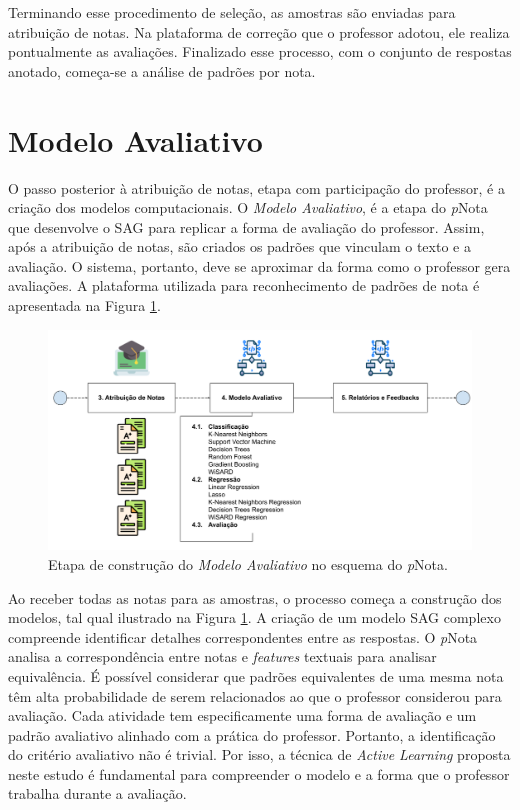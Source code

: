 Terminando esse procedimento de seleção, as amostras são enviadas para atribuição de notas. Na plataforma de correção que o professor adotou, ele realiza pontualmente as avaliações. Finalizado esse processo, com o conjunto de respostas anotado, começa-se a análise de padrões por nota.


\section{Modelo Avaliativo}
\label{sec-avaliacao}

O passo posterior à atribuição de notas, etapa com participação do professor, é a criação dos modelos computacionais. O \textit{Modelo Avaliativo}, é a etapa do \textit{p}Nota que desenvolve o SAG para replicar a forma de avaliação do professor. Assim, após a atribuição de notas, são criados os padrões que vinculam o texto e a avaliação.  O sistema, portanto, deve se aproximar da forma como o professor gera avaliações. A plataforma utilizada para reconhecimento de padrões de nota é apresentada na Figura \ref{fig-ma}.

\begin{figure}[!h]
\centering
\includegraphics[width=\textwidth]{figuras/esquema-ma-pNota.png}
\caption{Etapa de construção do \textit{Modelo Avaliativo} no esquema do \textit{p}Nota.}
\label{fig-ma}
\end{figure}

Ao receber todas as notas para as amostras, o processo começa a construção dos modelos, tal qual ilustrado na Figura \ref{fig-ma}. A criação de um modelo SAG complexo compreende identificar detalhes correspondentes entre as respostas. O \textit{p}Nota analisa a correspondência entre notas e \textit{features} textuais para analisar equivalência. É possível considerar que padrões equivalentes de uma mesma nota têm alta probabilidade de serem relacionados ao que o professor considerou para avaliação. Cada atividade tem especificamente uma forma de avaliação e um padrão avaliativo alinhado com a prática do professor. Portanto, a identificação do critério avaliativo não é trivial. Por isso, a técnica de \textit{Active Learning} proposta neste estudo é fundamental para compreender o modelo e a forma que o professor trabalha durante a avaliação.

